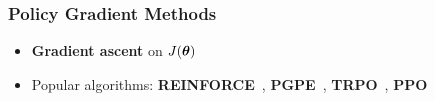 \documentclass[aspectratio=169, table]{beamer}
\newcommand{\enb}[1]{\textcolor{poliblue1}{\textbf{#1}}}
\begin{document}
\begin{frame}
\frametitle{Policy Gradient Methods}
\begin{overlayarea}{\textwidth}{\textheight}
\begin{itemize}
	\setlength{\itemsep}{15pt}
	\item<1-> \enb{Gradient ascent} on $J(\boldsymbol{\theta})$
	\item<2-> Popular algorithms: {\bf REINFORCE}~\citep{williams1992simple},
	{\bf PGPE}~\citep{sehnke2008policy},
	{\bf TRPO}~\citep{schulman2015trust}, {\bf PPO}~\citep{schulman2017proximal}
\end{itemize}
\vspace{15pt}
\end{overlayarea}
\end{frame}
\end{document}
